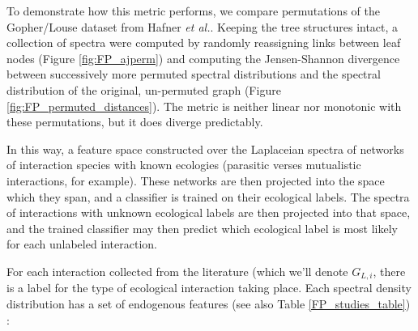 \noindent To demonstrate how this metric performs, we compare permutations of the Gopher/Louse dataset from Hafner {\em et al.}. Keeping the tree structures intact, a collection of spectra were computed by randomly reassigning links between leaf nodes (Figure \ref{fig:FP_ajperm}) and computing the Jensen-Shannon divergence between successively more permuted spectral distributions and the spectral distribution of the original, un-permuted graph (Figure \ref{fig:FP_permuted_distances}). The metric is neither linear nor monotonic with these permutations, but it does diverge predictably. 







In this way, a feature space constructed over the Laplaceian spectra of networks of interaction species with known ecologies (parasitic verses mutualistic interactions, for example). These networks are then projected into the space which they span, and a classifier is trained on their ecological labels. The spectra of interactions with unknown ecological labels are then projected into that space, and the trained classifier may then predict which ecological label is most likely for each unlabeled interaction.

For each interaction collected from the literature (which we'll denote $G_{L,i}$, there is a label for the type of ecological interaction taking place. Each spectral density distribution has a set of endogenous features (see also Table \ref{FP_studies_table}) :

